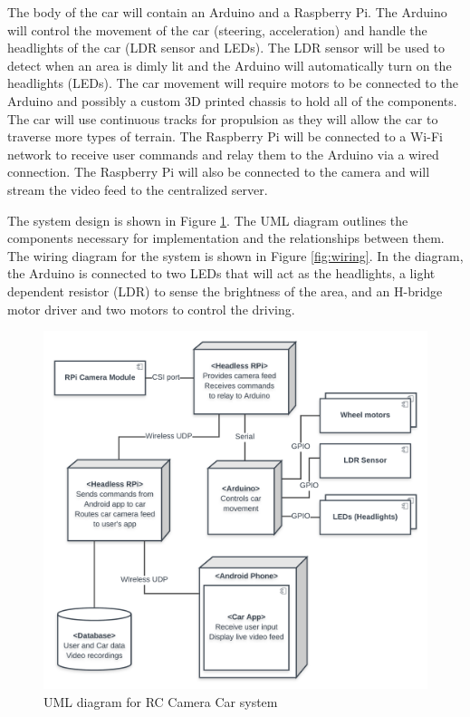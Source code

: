 \documentclass[letterpaper,12pt]{report}
\begin{document}
	The body of the car will contain an Arduino and a Raspberry Pi. The Arduino
	will control the movement of the car (steering, acceleration) and handle
	the headlights of the car (LDR sensor and LEDs). The LDR sensor will be
	used to detect when an area is dimly lit and the Arduino will automatically
	turn on the headlights (LEDs). The car movement will require motors to be
	connected to the Arduino and possibly a custom 3D printed chassis to hold
	all of the components. The car will use continuous tracks for propulsion as
	they will allow the car to traverse more types of terrain. The Raspberry Pi
	will be connected to a Wi-Fi network to receive user commands and relay
	them to the Arduino via a wired connection. The Raspberry Pi will also be
	connected to the camera and will stream the video feed to the centralized
	server.

	The system design is shown in Figure \ref{fig:uml}. The UML diagram
	outlines the components necessary for implementation and the
	relationships between them. The wiring diagram for the system is shown in
	Figure \ref{fig:wiring}. In the diagram, the Arduino is connected to two
	LEDs that will act as the headlights, a light dependent resistor (LDR) to
	sense the brightness of the area, and an H-bridge motor driver and two
	motors to control the driving.

	\begin{figure}[H]
    	\centering
		\includegraphics[width=\linewidth]{Proposal_UML_Diagram.png}
    	\caption{UML diagram for RC Camera Car system}
    	\label{fig:uml}
	\end{figure}
\end{document}
